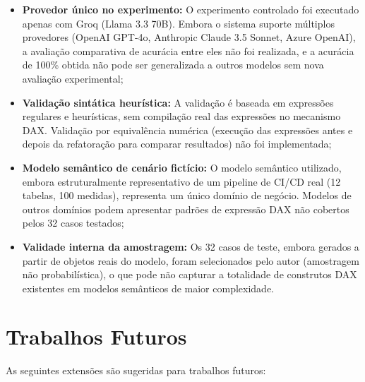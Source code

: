 \documentclass[
    12pt,               %
    openright,          %
    oneside,            %
    a4paper,            %
    chapter=TITLE,      %
    section=TITLE,      %
    brazil              %
]{abntex2}
\begin{document}
\begin{itemize}
    \item \textbf{Provedor único no experimento:} O experimento controlado foi executado apenas com Groq (Llama 3.3 70B). Embora o sistema suporte múltiplos provedores (OpenAI GPT-4o, Anthropic Claude 3.5 Sonnet, Azure OpenAI), a avaliação comparativa de acurácia entre eles não foi realizada, e a acurácia de 100\% obtida não pode ser generalizada a outros modelos sem nova avaliação experimental;
    \item \textbf{Validação sintática heurística:} A validação é baseada em expressões regulares e heurísticas, sem compilação real das expressões no mecanismo DAX. Validação por equivalência numérica (execução das expressões antes e depois da refatoração para comparar resultados) não foi implementada;
    \item \textbf{Modelo semântico de cenário fictício:} O modelo semântico utilizado, embora estruturalmente representativo de um pipeline de CI/CD real (12 tabelas, 100 medidas), representa um único domínio de negócio. Modelos de outros domínios podem apresentar padrões de expressão DAX não cobertos pelos 32 casos testados;
    \item \textbf{Validade interna da amostragem:} Os 32 casos de teste, embora gerados a partir de objetos reais do modelo, foram selecionados pelo autor (amostragem não probabilística), o que pode não capturar a totalidade de construtos DAX existentes em modelos semânticos de maior complexidade.
\end{itemize}

\section{Trabalhos Futuros}

As seguintes extensões são sugeridas para trabalhos futuros:
\end{document}
